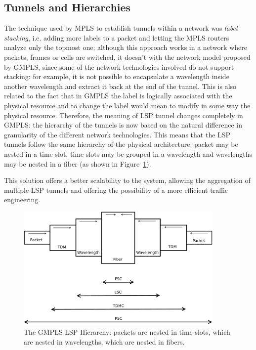 \documentclass[10pt,a4paper]{report}
\begin{document}
\subsection{Tunnels and Hierarchies}

The technique used by MPLS to establish tunnels within a network was
\textit{label stacking}, i.e. adding more labels to a packet and
letting the MPLS routers analyze only the topmost one; although this
approach works in a network where packets, frames or cells are
switched, it doesn't with the network model proposed by GMPLS, since
some of the network technologies involved do not support stacking: for
example, it is not possible to encapsulate a wavelength inside another
wavelength and extract it back at the end of the tunnel. This is also
related to the fact that in GMPLS the label is logically associated
with the physical resource and to change the label would mean to
modify in some way the physical resource. Therefore, the meaning of
LSP tunnel changes completely in GMPLS: the hierarchy of the tunnels
is now based on the natural difference in granularity of the different
network technologies. This means that the LSP tunnels follow the same
hierarchy of the physical architecture: packet may be nested in a
time-slot, time-slots may be grouped in a wavelength and wavelengths
may be nested in a fiber (as shown in
Figure~\ref{fig:gmpls_hierarchy}).

This solution offers a better scalability to the system, allowing the
aggregation of multiple LSP tunnels and offering the possibility of a
more efficient traffic engineering.

\begin{figure}[!htbp]
  \centering
  \includegraphics[width=0.9\textwidth]{img/gmpls_hierarchy}
  \caption[GMPLS LSP hierarchy]{The GMPLS LSP Hierarchy: packets are
    nested in time-slots, which are nested in wavelengths, which are
    nested in fibers.}
  \label{fig:gmpls_hierarchy}
\end{figure}
\end{document}
